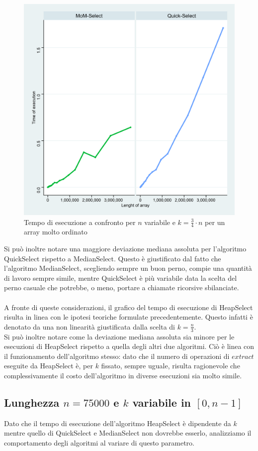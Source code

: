 \documentclass{article}
\begin{document}
	\begin{figure}[h!]		
		\centering
  		\includegraphics[width=0.7\columnwidth]{images/MoM_Quick_graph_ordered.png}
  		\caption{Tempo di esecuzione a confronto per $n$ variabile e $k=\frac{3}{4}\cdot n$ per un array molto ordinato}
  		\label{fig:graph2}
	\end{figure}
	
	Si può inoltre notare una maggiore deviazione mediana assoluta per l'algoritmo QuickSelect rispetto a MedianSelect. Questo è giustificato dal fatto che l'algoritmo MedianSelect, scegliendo sempre un buon perno, compie una quantità di lavoro sempre simile, mentre QuickSelect è più variabile data la scelta del perno casuale che potrebbe, o meno, portare a chiamate ricorsive sbilanciate.
	\\\\
	A fronte di queste considerazioni, il grafico del tempo di esecuzione di HeapSelect risulta in linea con le ipotesi teoriche formulate precedentemente. Questo infatti è denotato da una non linearità giustificata dalla scelta di $k=\frac{n}{3}$. 
	\\
	Si può inoltre notare come la deviazione mediana assoluta sia minore per le esecuzioni di HeapSelect rispetto a quella degli altri due algoritmi. Ciò è linea con il funzionamento dell'algoritmo stesso: dato che il numero di operazioni di $extract$ eseguite da HeapSelect è, per $k$ fissato, sempre uguale, risulta ragionevole che complessivamente il costo dell'algoritmo in diverse esecuzioni sia molto simile.
		
	\newpage
	
	\subsection{Lunghezza $n=75000$ e $k$ variabile in $[0,n-1]$}
	Dato che il tempo di esecuzione dell'algoritmo HeapSelect è dipendente da $k$ mentre quello di QuickSelect e MedianSelect non dovrebbe esserlo, analizziamo il comportamento degli algoritmi al variare di questo parametro.
	
\end{document}
